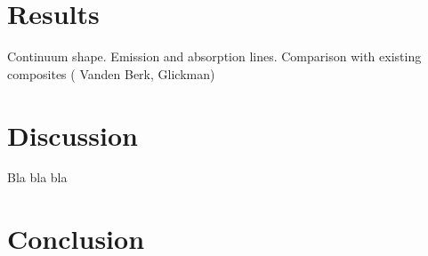 \documentclass[iop]{emulateapj}
\begin{document}
\section{Results}
Continuum shape. Emission and absorption lines. Comparison with existing composites ( Vanden Berk, Glickman)
\section{Discussion}
Bla bla bla
\section{Conclusion}




\end{document}
